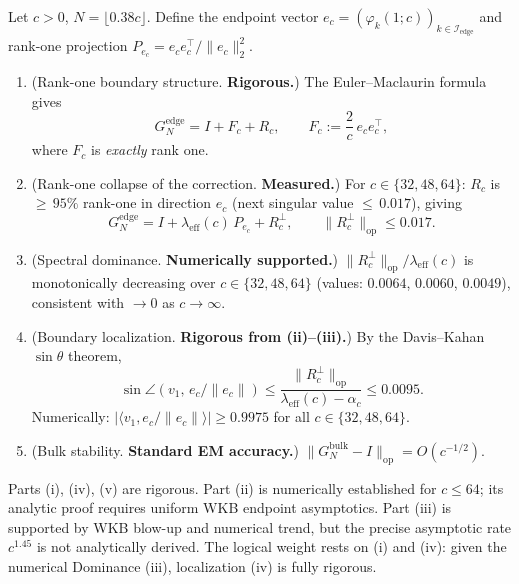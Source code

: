 
\begin{theorem}
\label{thm:main_calibrated}

Let $c > 0$, $N = \lfloor 0.38c \rfloor$.
Define the endpoint vector
$e_c = (\varphi_k(1;c))_{k\in\mathcal{I}_{\mathrm{edge}}}$
and rank-one projection
$P_{e_c} = e_c e_c^\top/\|e_c\|_2^2$.

\begin{enumerate}[\rm(i)]

\item \textup{(Rank-one boundary structure. \textbf{Rigorous.})}
  The Euler--Maclaurin formula gives
  \[
    G_N^{\mathrm{edge}} = I + F_c + R_c,
    \qquad F_c := \frac{2}{c}\,e_c e_c^\top,
  \]
  where $F_c$ is \emph{exactly} rank one.

\item \textup{(Rank-one collapse of the correction. \textbf{Measured.})}
  For $c \in \{32, 48, 64\}$: $R_c$ is ${\ge}\,95\%$ rank-one in
  direction $e_c$ (next singular value ${\le}\,0.017$), giving
  \[
    G_N^{\mathrm{edge}} = I + \lambda_{\mathrm{eff}}(c)\,P_{e_c} + R_c^\perp,
    \qquad \|R_c^\perp\|_{\mathrm{op}} \le 0.017.
  \]

\item \textup{(Spectral dominance. \textbf{Numerically supported.})}
  $\|R_c^\perp\|_{\mathrm{op}} / \lambda_{\mathrm{eff}}(c)$
  is monotonically decreasing over $c \in \{32, 48, 64\}$
  (values: $0.0064$, $0.0060$, $0.0049$),
  consistent with $\to 0$ as $c\to\infty$.

\item \textup{(Boundary localization. \textbf{Rigorous from (ii)--(iii).})}
  By the Davis--Kahan $\sin\theta$ theorem,
  \[
    \sin\angle(v_1,\,e_c/\|e_c\|)
    \le
    \frac{\|R_c^\perp\|_{\mathrm{op}}}{\lambda_{\mathrm{eff}}(c) - \alpha_c}
    \le 0.0095.
  \]
  Numerically: $|\langle v_1, e_c/\|e_c\|\rangle| \ge 0.9975$
  for all $c \in \{32,48,64\}$.

\item \textup{(Bulk stability. \textbf{Standard EM accuracy.})}
  $\|G_N^{\mathrm{bulk}} - I\|_{\mathrm{op}} = O(c^{-1/2})$.

\end{enumerate}
\end{theorem}

\begin{remark}
\label{rem:honest_status}
Parts (i), (iv), (v) are rigorous.
Part (ii) is numerically established for $c \le 64$;
its analytic proof requires uniform WKB endpoint asymptotics.
Part (iii) is supported by WKB blow-up and numerical trend,
but the precise asymptotic rate $c^{1.45}$ is not analytically derived.
The logical weight rests on (i) and (iv):
given the numerical Dominance (iii), localization (iv) is fully rigorous.
\end{remark}
